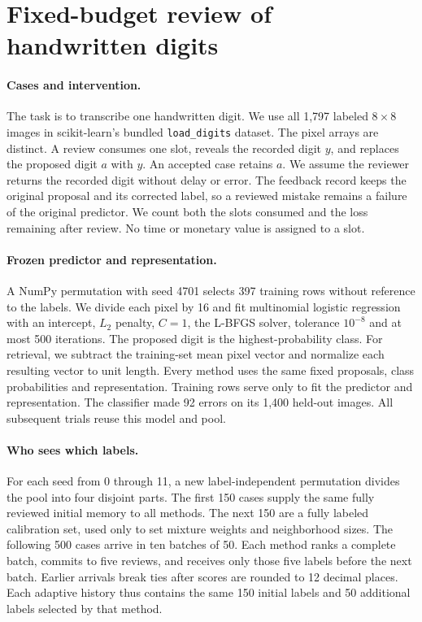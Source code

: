 \section{Fixed-budget review of handwritten digits}
\label{app:budgetref}

\paragraph{Cases and intervention.}
The task is to transcribe one handwritten digit. We use all 1,797 labeled
$8\times8$ images in scikit-learn's bundled \texttt{load\_digits} dataset.
The pixel arrays are distinct. A review consumes one slot, reveals the recorded
digit $y$, and replaces the proposed digit $a$ with $y$. An accepted case
retains $a$. We assume the reviewer returns the recorded digit without delay
or error. The feedback record keeps the original proposal and its corrected
label, so a reviewed mistake remains a failure of the original predictor.
We count both the slots consumed and the loss remaining after review. No
time or monetary value is assigned to a slot.

\paragraph{Frozen predictor and representation.}
A NumPy permutation with seed 4701 selects 397 training rows without reference
to the labels. We divide each pixel by 16 and fit multinomial logistic
regression with an intercept, $L_2$ penalty, $C=1$, the L-BFGS solver,
tolerance $10^{-8}$ and at most 500 iterations. The proposed digit is the
highest-probability class. For retrieval, we subtract the training-set mean
pixel vector and normalize each resulting vector to unit length. Every method
uses the same fixed proposals, class probabilities and representation. Training
rows serve only to fit the predictor and representation. The classifier made
92 errors on its 1,400 held-out images. All subsequent trials reuse this
model and pool.

\paragraph{Who sees which labels.}
For each seed from 0 through 11, a new label-independent permutation divides
the pool into four disjoint parts. The first 150 cases supply the same fully
reviewed initial memory to all methods. The next 150 are a fully labeled
calibration set, used only to set mixture weights and neighborhood sizes.
The following 500 cases arrive in ten batches of 50. Each method ranks a
complete batch, commits to five reviews, and receives only those five labels
before the next batch. Earlier arrivals break ties after scores are rounded
to 12 decimal places. Each adaptive history thus contains the same 150
initial labels and 50 additional labels selected by that method.

